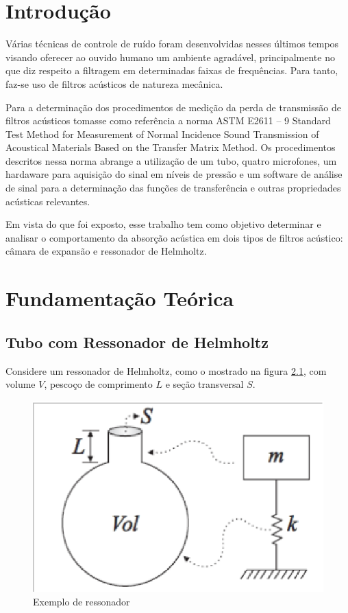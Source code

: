 \chapter{Introdução}\label{introducao}
Várias técnicas de controle de ruído foram desenvolvidas nesses últimos tempos visando oferecer ao ouvido humano um ambiente agradável, principalmente no que diz respeito a filtragem em determinadas faixas de frequências. Para tanto, faz-se uso de filtros acústicos de natureza mecânica.

Para a determinação dos procedimentos de medição da perda de transmissão de filtros acústicos tomasse como referência a norma ASTM E2611 – 9 Standard Test Method for Measurement of Normal Incidence Sound Transmission of Acoustical Materials Based on the Transfer Matrix Method. Os procedimentos descritos nessa norma abrange a utilização de um tubo, quatro microfones, um hardaware para aquisição do sinal em níveis de pressão e um software de análise de sinal para a determinação das funções de transferência e outras propriedades acústicas relevantes.

Em vista do que foi exposto, esse trabalho tem como objetivo determinar e analisar o comportamento da absorção acústica em dois tipos de filtros acústico: câmara de expansão e ressonador de Helmholtz.

\chapter{Fundamentação Teórica}\label{fundamentacao}

\section{Tubo com Ressonador de Helmholtz}

Considere um ressonador de Helmholtz, como o mostrado na figura \ref{fig.ressonador}, com volume $V$, pescoço de comprimento $L$ e seção transversal $S$.

\begin{figure}[h]
\centering
\includegraphics[scale=0.45]{ressonador.eps}
\caption{Exemplo de ressonador}
\label{fig.ressonador}
\end{figure}

